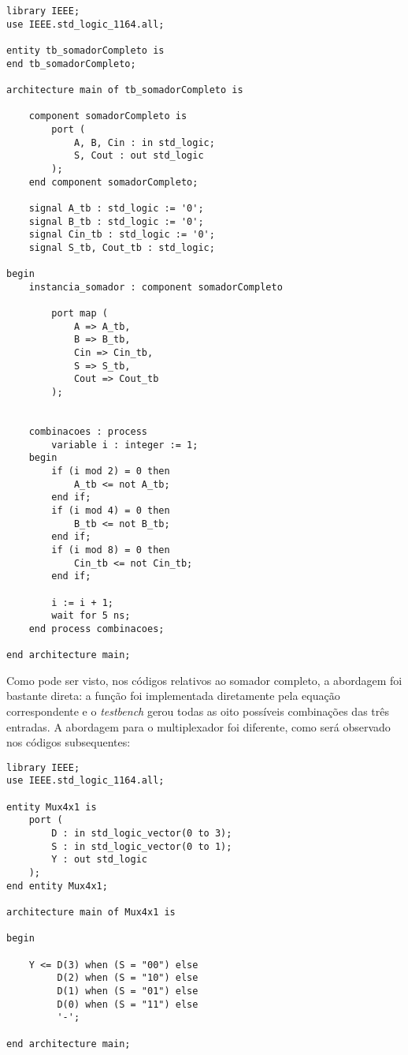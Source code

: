 \documentclass[a4paper,12pt]{article}
\newenvironment{code}{\captionsetup{type=listing}}{}
\begin{document}
\begin{code}
\begin{verbatim}
library IEEE;
use IEEE.std_logic_1164.all;

entity tb_somadorCompleto is
end tb_somadorCompleto;

architecture main of tb_somadorCompleto is

    component somadorCompleto is
        port (
            A, B, Cin : in std_logic;
            S, Cout : out std_logic
        );
    end component somadorCompleto;

    signal A_tb : std_logic := '0';
    signal B_tb : std_logic := '0';
    signal Cin_tb : std_logic := '0';
    signal S_tb, Cout_tb : std_logic;

begin
    instancia_somador : component somadorCompleto
    
        port map (
            A => A_tb,
            B => B_tb,
            Cin => Cin_tb,
            S => S_tb,
            Cout => Cout_tb
        );


    combinacoes : process
        variable i : integer := 1;
    begin
        if (i mod 2) = 0 then
            A_tb <= not A_tb;
        end if;
        if (i mod 4) = 0 then
            B_tb <= not B_tb;
        end if;
        if (i mod 8) = 0 then
            Cin_tb <= not Cin_tb;
        end if;

        i := i + 1;
        wait for 5 ns;
    end process combinacoes;
    
end architecture main;
\end{verbatim}
\vspace{10pt}
\end{code}

Como pode ser visto, nos códigos relativos ao somador completo, a abordagem foi bastante direta: a função foi implementada diretamente pela equação correspondente e o \textit{testbench} gerou todas as oito possíveis combinações das três entradas. A abordagem para o multiplexador foi diferente, como será observado nos códigos subsequentes:

\begin{code}
\begin{verbatim}
library IEEE;
use IEEE.std_logic_1164.all;

entity Mux4x1 is
    port (
        D : in std_logic_vector(0 to 3);
        S : in std_logic_vector(0 to 1);
        Y : out std_logic
    );
end entity Mux4x1;

architecture main of Mux4x1 is

begin

    Y <= D(3) when (S = "00") else
         D(2) when (S = "10") else
         D(1) when (S = "01") else
         D(0) when (S = "11") else
         '-';
        
end architecture main;
\end{verbatim}
\vspace{10pt}
\end{code}
\end{document}

